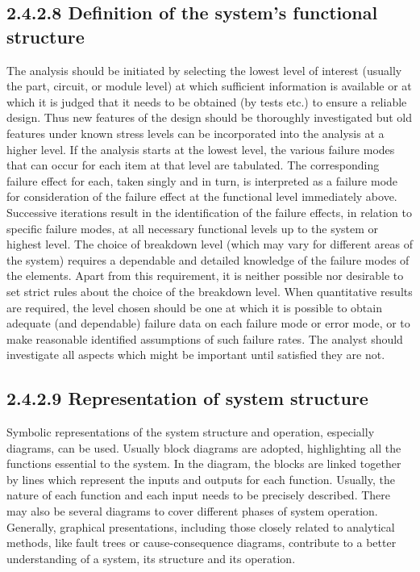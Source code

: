 \documentclass[./dissertation.tex]{subfiles}
\begin{document}
\subsection{2.4.2.8 Definition of the system's functional structure}

The analysis should be initiated by selecting the lowest level of interest (usually the part, circuit, or module level) at which sufficient information is available or at which it is judged that it needs to be obtained (by tests etc.) to ensure a reliable design. Thus new features of the design should be thoroughly investigated but old features under known stress levels can be incorporated into the analysis at a higher level. If the analysis starts at the lowest level, the various failure modes that can occur for each item at that level are tabulated. The corresponding failure effect for each, taken singly and in turn, is interpreted as a failure mode for consideration of the failure effect at the functional level immediately above. Successive iterations result in the identification of the failure effects, in relation to specific failure modes, at all necessary functional levels up to the system or highest level. The choice of breakdown level (which may vary for different areas of the system) requires a dependable and detailed knowledge of the failure modes of the elements. Apart from this requirement, it is neither possible nor desirable to set strict rules about the choice of the breakdown level. When quantitative results are required, the level chosen should be one at which it is possible to obtain adequate (and dependable) failure data on each failure mode or error mode, or to make reasonable identified assumptions of such failure rates. The analyst should investigate all aspects which might be important until satisfied they are not.

\subsection{2.4.2.9 Representation of system structure}

Symbolic representations of the system structure and operation, especially diagrams, can be used. Usually block diagrams are adopted, highlighting all the functions essential to the system. In the diagram, the blocks are linked together by lines which represent the inputs and outputs for each function. Usually, the nature of each function and each input needs to be precisely described. There may also be several diagrams to cover different phases of system operation. Generally, graphical presentations, including those closely related to analytical methods, like fault trees or cause-consequence diagrams, contribute to a better understanding of a system, its structure and its operation.
\end{document}
